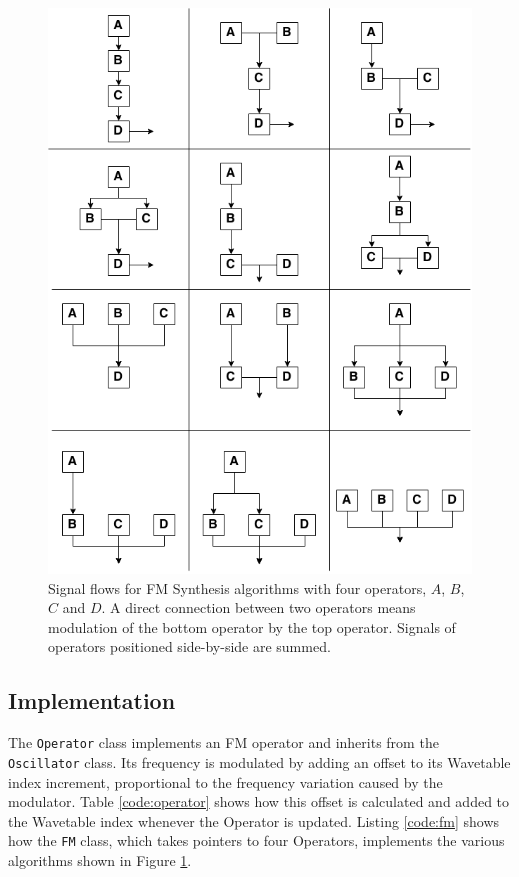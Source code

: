 \documentclass[12pt,twoside]{report}
\begin{document}
\begin{figure}[p!]
  \includegraphics[scale=0.75]{img/fmalgs}
  \caption{Signal flows for FM Synthesis algorithms with four operators, $A$, $B$, $C$ and $D$. A direct connection between two operators means modulation of the bottom operator by the top operator. Signals of operators positioned side-by-side are summed.}
  \label{fig:fmalgs}
\end{figure}

\subsection{Implementation}

The \texttt{Operator} class implements an FM operator and inherits from the \texttt{Oscillator} class. Its frequency is modulated by adding an offset to its Wavetable index increment, proportional to the frequency variation caused by the modulator. Table \ref{code:operator} shows how this offset is calculated and added to the Wavetable index whenever the Operator is updated. Listing \ref{code:fm} shows how the \texttt{FM} class, which takes pointers to four Operators, implements the various algorithms shown in Figure \ref{fig:fmalgs}.
\end{document}
